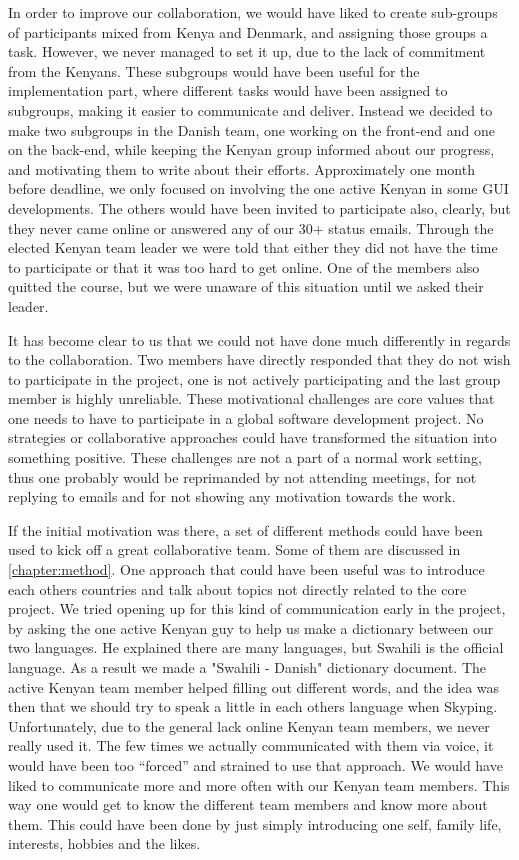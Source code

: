 In order to improve our collaboration, we would have liked to create sub-groups of participants mixed from Kenya and Denmark, and assigning those groups a task. However, we never managed to set it up, due to the lack of commitment from the Kenyans. These subgroups would have been useful for the implementation part, where different tasks would have been assigned to subgroups, making it easier to communicate and deliver. Instead we decided to make two subgroups in the Danish team, one working on the front-end and one on the back-end, while keeping the Kenyan group informed about our progress, and motivating them to write about their efforts. Approximately one month before deadline, we only focused on involving the one active Kenyan in some GUI developments. The others would have been invited to participate also, clearly, but they never came online or answered any of our 30+ status emails. Through the elected Kenyan team leader we were told that either they did not have the time to participate or that it was too hard to get online. One of the members also quitted the course, but we were unaware of this situation until we asked their leader.

It has become clear to us that we could not have done much differently in regards to the collaboration. Two members have directly responded that they do not wish to participate in the project, one is not actively participating and the last group member is highly unreliable. These motivational challenges are core values that one needs to have to participate in a global software development project. No strategies or collaborative approaches could have transformed the situation into something positive. These challenges are not a part of a normal work setting, thus one probably would be reprimanded by not attending meetings, for not replying to emails and for not showing any motivation towards the work.

If the initial motivation was there, a set of different methods could have been used to kick off a great collaborative team. Some of them are discussed in \ref{chapter:method}. One approach that could have been useful was to introduce each others countries and talk about topics not directly related to the core project. We tried opening up for this kind of communication early in the project, by asking the one active Kenyan guy to help us make a dictionary between our two languages. He explained there are many languages, but Swahili is the official language. As a result we made a "Swahili - Danish" dictionary document. The active Kenyan team member helped filling out different words, and the idea was then that we should try to speak a little in each others language when Skyping. Unfortunately, due to the general lack online Kenyan team members, we never really used it. The few times we actually communicated with them via voice, it would have been too ``forced'' and strained to use that approach. We would have liked to communicate more and more often with our Kenyan team members. This way one would get to know the different team members and know more about them. This could have been done by just simply introducing one self, family life, interests, hobbies and the likes.

